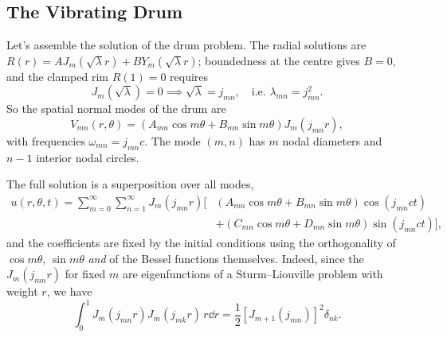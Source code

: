 \subsection{The Vibrating Drum}

Let's assemble the solution of the drum problem. The radial solutions are $R(r) = A J_m(\sqrt{\lambda} r) + B Y_m(\sqrt{\lambda}r)$; boundedness at the centre gives $B = 0$, and the clamped rim $R(1) = 0$ requires
$$
J_m(\sqrt{\lambda}) = 0 \implies \sqrt{\lambda} = j_{mn}, \quad \text{i.e. } \lambda_{mn} = j_{mn}^2.
$$
So the spatial normal modes of the drum are
$$
V_{mn}(r, \theta) = \left(A_{mn} \cos m \theta + B_{mn} \sin m \theta\right) J_m (j_{mn} r),
$$
with frequencies $\omega_{mn} = j_{mn} c$. The mode $(m, n)$ has $m$ nodal diameters and $n - 1$ interior nodal circles.

\begin{center}
\end{center}

The full solution is a superposition over all modes,
\begin{align*}
u(r, \theta, t) = \sum_{m = 0}^{\infty} \sum_{n = 1}^{\infty} J_m(j_{mn} r) \Big[&\left(A_{mn} \cos m\theta + B_{mn} \sin m \theta\right) \cos (j_{mn} c t) \\
&+ \left(C_{mn} \cos m \theta + D_{mn} \sin m \theta\right) \sin (j_{mn} c t)\Big],
\end{align*}
and the coefficients are fixed by the initial conditions using the orthogonality of $\cos m\theta$, $\sin m \theta$ \emph{and} of the Bessel functions themselves. Indeed, since the $J_m(j_{mn} r)$ for fixed $m$ are eigenfunctions of a Sturm--Liouville problem with weight $r$, we have
$$
\int_0^1 J_m(j_{mn} r) J_m (j_{mk}r)\, r \dd r = \frac{1}{2}\left[J_{m + 1}(j_{mn})\right]^2 \delta_{nk}.
$$

